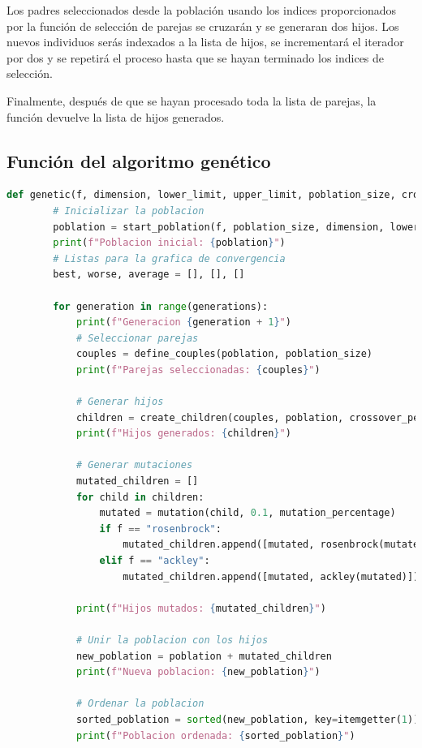 \documentclass{report}
\begin{document}
    Los padres seleccionados desde la población usando los indices proporcionados por la función de selección de parejas se cruzarán y se generaran dos hijos.
    Los nuevos individuos serás indexados a la lista de hijos, se incrementará el iterador por dos y se repetirá el proceso hasta que se hayan terminado los indices de selección.

    Finalmente, después de que se hayan procesado toda la lista de parejas, la función devuelve la lista de hijos generados.

    \subsection*{Función del algoritmo genético}
    \begin{lstlisting}[language=Python, style=mystyle, caption={Funcion genetico}]
    def genetic(f, dimension, lower_limit, upper_limit, poblation_size, crossover_percentage, mutation_percentage, generations):
        # Inicializar la poblacion
        poblation = start_poblation(f, poblation_size, dimension, lower_limit, upper_limit)
        print(f"Poblacion inicial: {poblation}")
        # Listas para la grafica de convergencia
        best, worse, average = [], [], []
    
        for generation in range(generations):
            print(f"Generacion {generation + 1}")
            # Seleccionar parejas
            couples = define_couples(poblation, poblation_size)
            print(f"Parejas seleccionadas: {couples}")
    
            # Generar hijos
            children = create_children(couples, poblation, crossover_percentage)
            print(f"Hijos generados: {children}")
    
            # Generar mutaciones
            mutated_children = []
            for child in children:
                mutated = mutation(child, 0.1, mutation_percentage)
                if f == "rosenbrock":
                    mutated_children.append([mutated, rosenbrock(mutated)])
                elif f == "ackley":
                    mutated_children.append([mutated, ackley(mutated)])
    
            print(f"Hijos mutados: {mutated_children}")
    
            # Unir la poblacion con los hijos
            new_poblation = poblation + mutated_children
            print(f"Nueva poblacion: {new_poblation}")
    
            # Ordenar la poblacion
            sorted_poblation = sorted(new_poblation, key=itemgetter(1))
            print(f"Poblacion ordenada: {sorted_poblation}")
    

\end{lstlisting}
\end{document}
